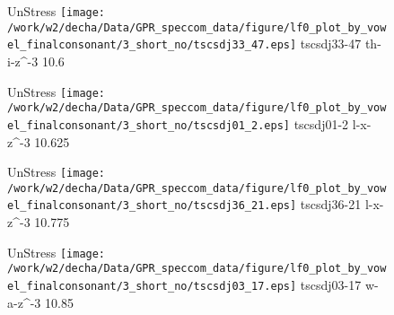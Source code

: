\documentclass{article}
\begin{document}
\begin{figure}[t]
\begin{minipage}[b]{.24\textwidth}
UnStress
\centering
\texttt{[image: /work/w2/decha/Data/GPR\_speccom\_data/figure/lf0\_plot\_by\_vowel\_finalconsonant/3\_short\_no/tscsdj33\_47.eps]}
tscsdj33-47 th-i-z\textasciicircum-3 10.6
\end{minipage}
\begin{minipage}[b]{.24\textwidth}
UnStress
\centering
\texttt{[image: /work/w2/decha/Data/GPR\_speccom\_data/figure/lf0\_plot\_by\_vowel\_finalconsonant/3\_short\_no/tscsdj01\_2.eps]}
tscsdj01-2 l-x-z\textasciicircum-3 10.625
\end{minipage}
\begin{minipage}[b]{.24\textwidth}
UnStress
\centering
\texttt{[image: /work/w2/decha/Data/GPR\_speccom\_data/figure/lf0\_plot\_by\_vowel\_finalconsonant/3\_short\_no/tscsdj36\_21.eps]}
tscsdj36-21 l-x-z\textasciicircum-3 10.775
\end{minipage}
\begin{minipage}[b]{.24\textwidth}
UnStress
\centering
\texttt{[image: /work/w2/decha/Data/GPR\_speccom\_data/figure/lf0\_plot\_by\_vowel\_finalconsonant/3\_short\_no/tscsdj03\_17.eps]}
tscsdj03-17 w-a-z\textasciicircum-3 10.85
\end{minipage}
\end{figure}
\end{document}
